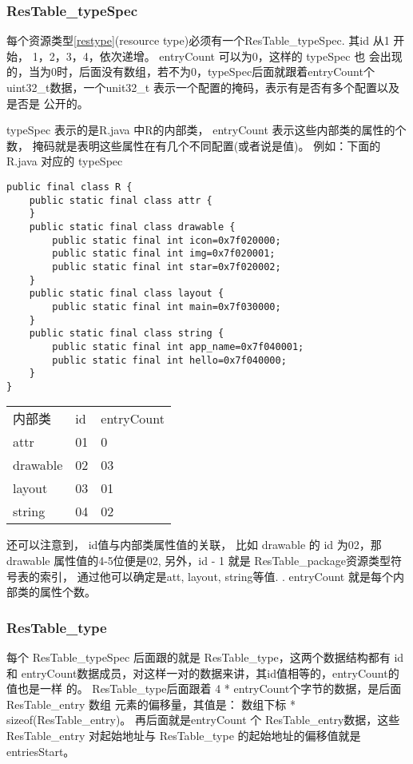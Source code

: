 \documentclass[a4paper,11pt]{article}
\begin{document}
\subsubsection{ResTable_typeSpec}
每个资源类型\ref{restype}(resource type)必须有一个ResTable_typeSpec.
其id 从1 开始， 1，2，3，4，依次递增。 entryCount 可以为0，这样的 typeSpec 也
会出现的，当为0时，后面没有数组，若不为0，typeSpec后面就跟着entryCount个
uint32_t数据，一个unit32_t 表示一个配置的掩码，表示有是否有多个配置以及是否是
公开的。

typeSpec 表示的是R.java 中R的内部类， entryCount 表示这些内部类的属性的个数，
掩码就是表明这些属性在有几个不同配置(或者说是值)。
例如：下面的R.java 对应的 typeSpec
\begin{lstlisting}[basicstyle=\tiny]
public final class R {
    public static final class attr {
    }
    public static final class drawable {
        public static final int icon=0x7f020000;
        public static final int img=0x7f020001;
        public static final int star=0x7f020002;
    }
    public static final class layout {
        public static final int main=0x7f030000;
    }
    public static final class string {
        public static final int app_name=0x7f040001;
        public static final int hello=0x7f040000;
    }
}
\end{lstlisting}
\begin{tabular}{lll}
    内部类 & id & entryCount \\
    attr & 01 & 0 \\
    drawable & 02 & 03 \\
    layout & 03 & 01 \\
    string &04 & 02\\
\end{tabular}
还可以注意到， id值与内部类属性值的关联， 比如 drawable 的 id 为02，那drawable
属性值的4-5位便是02, 另外，id - 1 就是 ResTable_package资源类型符号表的索引，
通过他可以确定是att, layout, string等值.
. entryCount 就是每个内部类的属性个数。

\subsubsection{ResTable_type}
每个 ResTable_typeSpec 后面跟的就是 ResTable_type，这两个数据结构都有 id 和
entryCount数据成员，对这样一对的数据来讲，其id值相等的，entryCount的值也是一样
的。
ResTable_type后面跟着 4 * entryCount个字节的数据，是后面 ResTable_entry 数组
元素的偏移量，其值是： 数组下标 * sizeof(ResTable_entry)。
再后面就是entryCount 个 ResTable_entry数据，这些ResTable_entry 对起始地址与
ResTable_type 的起始地址的偏移值就是 entriesStart。
\end{document}

